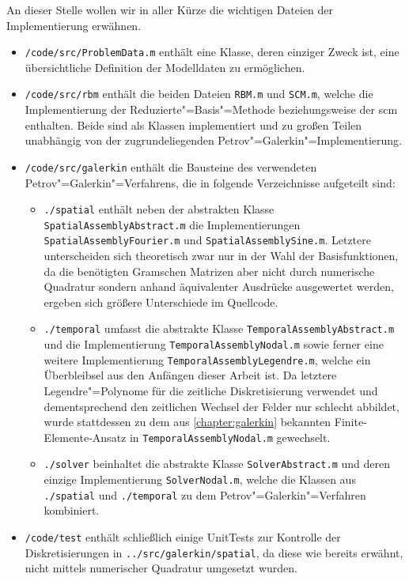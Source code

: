 \documentclass[../main.tex]{subfiles}
\begin{document}
An dieser Stelle wollen wir in aller Kürze die wichtigen Dateien der Implementierung erwähnen.
\begin{itemize}[leftmargin=1.5em]
    \item \verb!/code/src/ProblemData.m! enthält eine Klasse, deren einziger Zweck ist, eine übersichtliche Definition der Modelldaten zu ermöglichen.
    \item \verb!/code/src/rbm! enthält die beiden Dateien \verb!RBM.m! und \verb!SCM.m!, welche die Implementierung der Reduzierte"=Basis"=Methode beziehungsweise der \acl{scm} enthalten.
    Beide sind als Klassen implementiert und zu großen Teilen unabhängig von der zugrundeliegenden Petrov"=Galerkin"=Implementierung.
    \item \verb!/code/src/galerkin! enthält die Bausteine des verwendeten Petrov"=Galerkin"=Verfahrens, die in folgende Verzeichnisse aufgeteilt sind:
    \begin{itemize}[leftmargin=1.5em]
        \item \verb!./spatial! enthält neben der abstrakten Klasse \verb!SpatialAssemblyAbstract.m! die Implementierungen \verb!SpatialAssemblyFourier.m! und \verb!SpatialAssemblySine.m!.
        Letztere unterscheiden sich theoretisch zwar nur in der Wahl der Basisfunktionen, da die benötigten Gramschen Matrizen aber nicht durch numerische Quadratur sondern anhand äquivalenter Ausdrücke ausgewertet werden, ergeben sich größere Unterschiede im Quellcode.
        \item \verb!./temporal! umfasst die abstrakte Klasse \verb!TemporalAssemblyAbstract.m! und die Implementierung \verb!TemporalAssemblyNodal.m! sowie ferner eine weitere Implementierung \verb!TemporalAssemblyLegendre.m!, welche ein Überbleibsel aus den Anfängen dieser Arbeit ist.
        Da letztere Legendre"=Polynome für die zeitliche Diskretisierung verwendet und dementsprechend den zeitlichen Wechsel der Felder nur schlecht abbildet, wurde stattdessen zu dem aus \cref{chapter:galerkin} bekannten Finite-Elemente-Ansatz in \verb!TemporalAssemblyNodal.m! gewechselt.
        \item \verb!./solver! beinhaltet die abstrakte Klasse \verb!SolverAbstract.m! und deren einzige Implementierung \verb!SolverNodal.m!, welche die Klassen aus \verb!./spatial! und \verb!./temporal! zu dem Petrov"=Galerkin"=Verfahren kombiniert.
    \end{itemize}
    \item \verb!/code/test! enthält schließlich einige UnitTests zur Kontrolle der Diskretisierungen in \verb!../src/galerkin/spatial!, da diese wie bereits erwähnt, nicht mittels numerischer Quadratur umgesetzt wurden.
\end{itemize}
\end{document}
